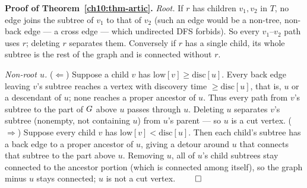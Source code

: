 \begin{center}
\end{center}

\begin{formalbox}
\textbf{Proof of Theorem~\ref{ch10:thm-artic}.}
\emph{Root.} If $r$ has children $v_1,v_2$ in $T$, no edge joins the subtree of $v_1$ to
that of $v_2$ (such an edge would be a non-tree, non-back edge --- a cross edge ---
which undirected DFS forbids). So every $v_1$--$v_2$ path uses $r$; deleting $r$
separates them. Conversely if $r$ has a single child, its whole subtree is the rest of
the graph and is connected without $r$.

\emph{Non-root $u$.} ($\Leftarrow$) Suppose a child $v$ has
$\mathrm{low}[v]\ge\mathrm{disc}[u]$. Every back edge leaving $v$'s subtree reaches a
vertex with discovery time $\ge\mathrm{disc}[u]$, that is, $u$ or a descendant of $u$;
none reaches a proper ancestor of $u$. Thus every path from $v$'s subtree to the part
of $G$ above $u$ passes through $u$. Deleting $u$ separates $v$'s subtree (nonempty,
not containing $u$) from $u$'s parent --- so $u$ is a cut vertex.
($\Rightarrow$) Suppose every child $v$ has $\mathrm{low}[v]<\mathrm{disc}[u]$. Then each
child's subtree has a back edge to a proper ancestor of $u$, giving a detour around $u$
that connects that subtree to the part above $u$. Removing $u$, all of $u$'s child
subtrees stay connected to the ancestor portion (which is connected among itself), so
the graph minus $u$ stays connected; $u$ is not a cut vertex. $\qed$
\end{formalbox}

